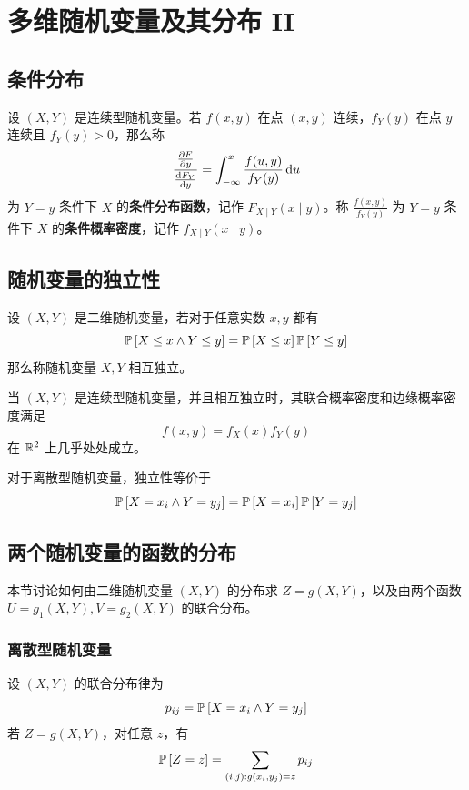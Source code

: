 \section{多维随机变量及其分布 II}

\subsection{条件分布}

\begin{definition}[连续型随机变量的条件分布]
    设 $(X, Y)$ 是连续型随机变量。若 $f(x, y)$ 在点 $(x, y)$ 连续，$f_Y(y)$ 在点 $y$ 连续且 $f_Y(y) > 0$，那么称
    $$
    \frac{\pdv{F}{y}}{\dv{F_Y}{y}} = \int_{- \infty}^{x} \frac{f(u, y)}{f_Y(y)} \dd{u}
    $$
    为 $Y = y$ 条件下 $X$ 的\textbf{条件分布函数}，记作 $F_{X \mid Y}(x \mid y)$。称 $\frac{f(x, y)}{f_Y(y)}$ 为 $Y = y$ 条件下 $X$ 的\textbf{条件概率密度}，记作 $f_{X \mid Y}(x \mid y)$。
\end{definition}

\subsection{随机变量的独立性}

\begin{definition}[随机变量的独立性]
    设 $(X, Y)$ 是二维随机变量，若对于任意实数 $x, y$ 都有
    $$
    \operatorname{\mathbb{P}}\left[X \le x \land Y \le y\right] = \operatorname{\mathbb{P}}\left[X \le x\right] \operatorname{\mathbb{P}}\left[Y \le y\right]
    $$
    那么称随机变量 $X, Y$ 相互独立。
\end{definition}

当 $(X, Y)$ 是连续型随机变量，并且相互独立时，其联合概率密度和边缘概率密度满足
$$
f(x, y) = f_X(x) f_Y(y)
$$
在 $\mathbb{R}^2$ 上几乎处处成立。

对于离散型随机变量，独立性等价于
$$
\operatorname{\mathbb{P}}\left[X = x_i \land Y = y_j\right] = \operatorname{\mathbb{P}}\left[X = x_i\right] \operatorname{\mathbb{P}}\left[Y = y_j\right]
$$

\subsection{两个随机变量的函数的分布}

本节讨论如何由二维随机变量 $(X, Y)$ 的分布求 $Z = g(X, Y)$，以及由两个函数 $U = g_1(X, Y), V = g_2(X, Y)$ 的联合分布。

\subsubsection{离散型随机变量}

设 $(X, Y)$ 的联合分布律为
$$
p_{ij} = \operatorname{\mathbb{P}}\left[X = x_i \land Y = y_j\right]
$$
若 $Z = g(X, Y)$，对任意 $z$，有
$$
\operatorname{\mathbb{P}}\left[Z = z\right] = \sum_{(i, j): g(x_i, y_j) = z} p_{ij}
$$

